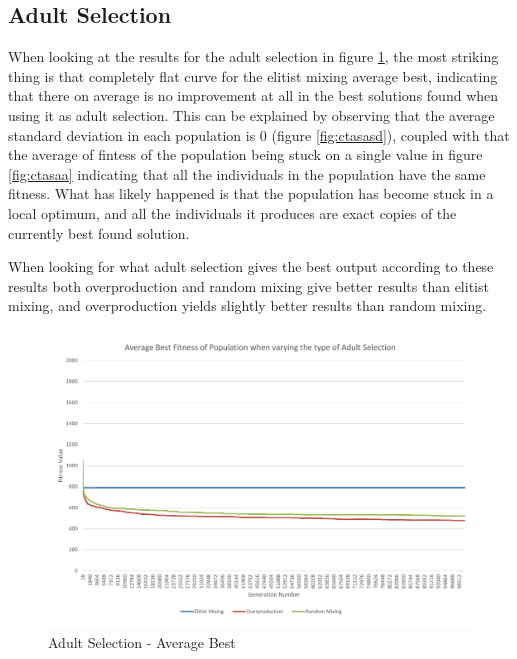 \clearpage

\subsection{Adult Selection} %
\label{sub:adult_selection}

When looking at the results for the adult selection in figure \ref{fig:ctasab}, the most striking thing is that completely flat curve for the elitist mixing average best, indicating that there on average is no improvement at all in the best solutions found when using it as adult selection. This can be explained by observing that the average standard deviation in each population is 0 (figure \ref{fig:ctasasd}), coupled with that the average of fintess of the population being stuck on a single value in figure \ref{fig:ctasaa} indicating that all the individuals in the population have the same fitness. What has likely happened is that the population has become stuck in a local optimum, and all the individuals it produces are exact copies of the currently best found solution.

When looking for what adult selection gives the best output according to these results both overproduction and random mixing give better results than elitist mixing, and overproduction yields slightly better results than random mixing.

\begin{landscape}
\begin{figure}[thbp]
	\centerline{\includegraphics[height=0.945\textwidth]{figures/CircleTests/AdultSelection/CircleTestAdultSelectionAverageBest.pdf}}
	\caption{Adult Selection - Average Best}
	\label{fig:ctasab}
\end{figure}
\end{landscape}

